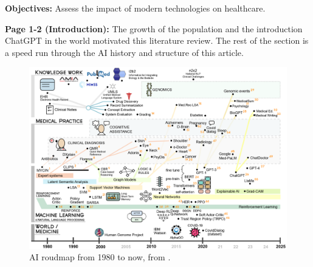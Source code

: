     \textbf{Objectives:}
    Assess the impact of modern technologies on healthcare.
    
    \textbf{Page 1-2 (Introduction):}
    The growth of the population and the introduction ChatGPT in the world motivated this literature review. The rest of the section is a speed run through the AI history and structure of this article.
    \begin{figure}[H]
        \centering
        \includegraphics[width=1\textwidth]{figures/SR0022US23/fig1.png}
        \caption{AI roudmap from 1980 to now, from \cite{x090}.}
        \label{fig1:SR0022US23}
    \end{figure}
    
